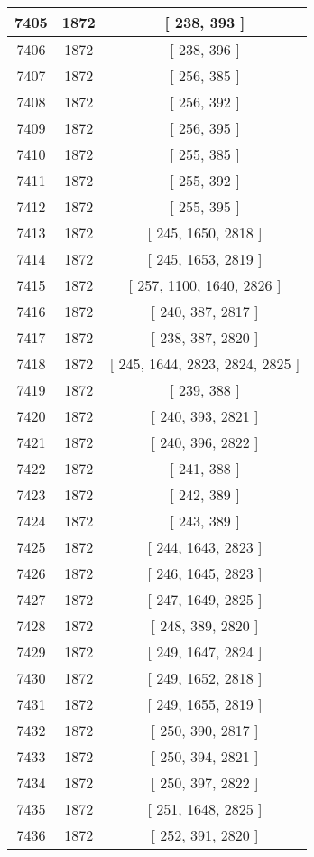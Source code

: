 \begin{center}
\begin{longtable}[H]{|| c c c ||}
\hline
7405 & 1872 & [ 238, 393 ] \\ 
\hline
7406 & 1872 & [ 238, 396 ] \\ 
\hline
7407 & 1872 & [ 256, 385 ] \\ 
\hline
7408 & 1872 & [ 256, 392 ] \\ 
\hline
7409 & 1872 & [ 256, 395 ] \\ 
\hline
7410 & 1872 & [ 255, 385 ] \\ 
\hline
7411 & 1872 & [ 255, 392 ] \\ 
\hline
7412 & 1872 & [ 255, 395 ] \\ 
\hline
7413 & 1872 & [ 245, 1650, 2818 ] \\ 
\hline
7414 & 1872 & [ 245, 1653, 2819 ] \\ 
\hline
7415 & 1872 & [ 257, 1100, 1640, 2826 ] \\ 
\hline
7416 & 1872 & [ 240, 387, 2817 ] \\ 
\hline
7417 & 1872 & [ 238, 387, 2820 ] \\ 
\hline
7418 & 1872 & [ 245, 1644, 2823, 2824, 2825 ] \\ 
\hline
7419 & 1872 & [ 239, 388 ] \\ 
\hline
7420 & 1872 & [ 240, 393, 2821 ] \\ 
\hline
7421 & 1872 & [ 240, 396, 2822 ] \\ 
\hline
7422 & 1872 & [ 241, 388 ] \\ 
\hline
7423 & 1872 & [ 242, 389 ] \\ 
\hline
7424 & 1872 & [ 243, 389 ] \\ 
\hline
7425 & 1872 & [ 244, 1643, 2823 ] \\ 
\hline
7426 & 1872 & [ 246, 1645, 2823 ] \\ 
\hline
7427 & 1872 & [ 247, 1649, 2825 ] \\ 
\hline
7428 & 1872 & [ 248, 389, 2820 ] \\ 
\hline
7429 & 1872 & [ 249, 1647, 2824 ] \\ 
\hline
7430 & 1872 & [ 249, 1652, 2818 ] \\ 
\hline
7431 & 1872 & [ 249, 1655, 2819 ] \\ 
\hline
7432 & 1872 & [ 250, 390, 2817 ] \\ 
\hline
7433 & 1872 & [ 250, 394, 2821 ] \\ 
\hline
7434 & 1872 & [ 250, 397, 2822 ] \\ 
\hline
7435 & 1872 & [ 251, 1648, 2825 ] \\ 
\hline
7436 & 1872 & [ 252, 391, 2820 ] \\ 

\end{longtable}
\end{center}
